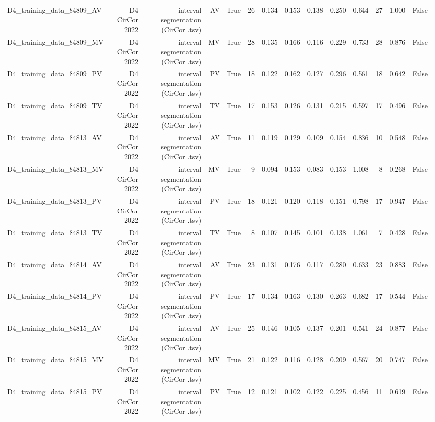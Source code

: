 \begin{table}[htbp]
\begin{tabular}{lrrrrrrrrrrrrr}
    D4\_training\_data\_84809\_AV & D4 CirCor 2022 & interval segmentation (CirCor .tsv) & AV & True & 26 & 0.134 & 0.153 & 0.138 & 0.250 & 0.644 & 27 & 1.000 & False \\
    D4\_training\_data\_84809\_MV & D4 CirCor 2022 & interval segmentation (CirCor .tsv) & MV & True & 28 & 0.135 & 0.166 & 0.116 & 0.229 & 0.733 & 28 & 0.876 & False \\
    D4\_training\_data\_84809\_PV & D4 CirCor 2022 & interval segmentation (CirCor .tsv) & PV & True & 18 & 0.122 & 0.162 & 0.127 & 0.296 & 0.561 & 18 & 0.642 & False \\
    D4\_training\_data\_84809\_TV & D4 CirCor 2022 & interval segmentation (CirCor .tsv) & TV & True & 17 & 0.153 & 0.126 & 0.131 & 0.215 & 0.597 & 17 & 0.496 & False \\
    D4\_training\_data\_84813\_AV & D4 CirCor 2022 & interval segmentation (CirCor .tsv) & AV & True & 11 & 0.119 & 0.129 & 0.109 & 0.154 & 0.836 & 10 & 0.548 & False \\
    D4\_training\_data\_84813\_MV & D4 CirCor 2022 & interval segmentation (CirCor .tsv) & MV & True & 9 & 0.094 & 0.153 & 0.083 & 0.153 & 1.008 & 8 & 0.268 & False \\
    D4\_training\_data\_84813\_PV & D4 CirCor 2022 & interval segmentation (CirCor .tsv) & PV & True & 18 & 0.121 & 0.120 & 0.118 & 0.151 & 0.798 & 17 & 0.947 & False \\
    D4\_training\_data\_84813\_TV & D4 CirCor 2022 & interval segmentation (CirCor .tsv) & TV & True & 8 & 0.107 & 0.145 & 0.101 & 0.138 & 1.061 & 7 & 0.428 & False \\
    D4\_training\_data\_84814\_AV & D4 CirCor 2022 & interval segmentation (CirCor .tsv) & AV & True & 23 & 0.131 & 0.176 & 0.117 & 0.280 & 0.633 & 23 & 0.883 & False \\
    D4\_training\_data\_84814\_PV & D4 CirCor 2022 & interval segmentation (CirCor .tsv) & PV & True & 17 & 0.134 & 0.163 & 0.130 & 0.263 & 0.682 & 17 & 0.544 & False \\
    D4\_training\_data\_84815\_AV & D4 CirCor 2022 & interval segmentation (CirCor .tsv) & AV & True & 25 & 0.146 & 0.105 & 0.137 & 0.201 & 0.541 & 24 & 0.877 & False \\
    D4\_training\_data\_84815\_MV & D4 CirCor 2022 & interval segmentation (CirCor .tsv) & MV & True & 21 & 0.122 & 0.116 & 0.128 & 0.209 & 0.567 & 20 & 0.747 & False \\
    D4\_training\_data\_84815\_PV & D4 CirCor 2022 & interval segmentation (CirCor .tsv) & PV & True & 12 & 0.121 & 0.102 & 0.122 & 0.225 & 0.456 & 11 & 0.619 & False \\

\end{tabular}
\end{table}

